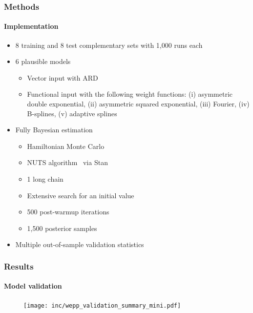 \documentclass{snedecorbeamer}
\newcommand{\appendixlink}[1]{
  \hyperlink{#1}{\resizebox{!}{1.5ex}{\beamergotobutton{appendix}}}
}
\begin{document}
\begin{frame}
  \frametitle{Methods}
  \framesubtitle{Implementation}

  \begin{itemize}
  \item 8 training and 8 test complementary sets with 1,000 runs each
  \item 6 plausible models
    \begin{itemize}
    \item Vector input with ARD
    \item Functional input with the following weight functions: (i) asymmetric
double exponential, (ii) asymmetric squared exponential, (iii) Fourier, (iv)
B-splines, (v) adaptive splines
    \end{itemize}
  \item
    \appendixlink{frm:bayesian-priors}
    Fully Bayesian estimation
    \begin{itemize}
    \item Hamiltonian Monte Carlo~\cite[ch. 5]{brooks2011}
    \item NUTS algorithm~\cite{hoffman2014} via
      Stan~\cite{standevelopmentteam2021}
    \item 1 long chain~\cite{raftery1992}
    \item Extensive search for an initial value
    \item 500 post-warmup iterations
    \item 1,500 posterior samples
    \end{itemize}
  \item \appendixlink{frm:validation}
    Multiple out-of-sample validation statistics
  \end{itemize}
\end{frame}

\begin{frame}
  \frametitle{Results}
  \framesubtitle{Model validation}

  \begin{figure}
    \centering
    \texttt{[image: inc/wepp\_validation\_summary\_mini.pdf]}
  \end{figure}

\end{frame}
\end{document}

